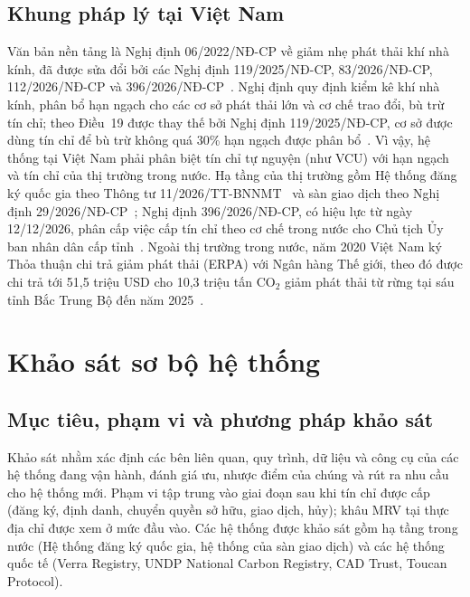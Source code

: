 \subsection*{Khung pháp lý tại Việt Nam}

Văn bản nền tảng là Nghị định 06/2022/NĐ-CP về giảm nhẹ phát thải khí nhà kính, đã được sửa đổi bởi các Nghị định 119/2025/NĐ-CP, 83/2026/NĐ-CP, 112/2026/NĐ-CP và 396/2026/NĐ-CP~\cite{vietnam2022nghidinh06}. Nghị định quy định kiểm kê khí nhà kính, phân bổ hạn ngạch cho các cơ sở phát thải lớn và cơ chế trao đổi, bù trừ tín chỉ; theo Điều~19 được thay thế bởi Nghị định 119/2025/NĐ-CP, cơ sở được dùng tín chỉ để bù trừ không quá 30\% hạn ngạch được phân bổ~\cite{vietnam2025nghidinh119}. Vì vậy, hệ thống tại Việt Nam phải phân biệt tín chỉ tự nguyện (như VCU) với hạn ngạch và tín chỉ của thị trường trong nước. Hạ tầng của thị trường gồm Hệ thống đăng ký quốc gia theo Thông tư 11/2026/TT-BNNMT~\cite{vietnam2026thongtu11} và sàn giao dịch theo Nghị định 29/2026/NĐ-CP~\cite{vietnam2026nghidinh29}; Nghị định 396/2026/NĐ-CP, có hiệu lực từ ngày 12/12/2026, phân cấp việc cấp tín chỉ theo cơ chế trong nước cho Chủ tịch Ủy ban nhân dân cấp tỉnh~\cite{vietnam2026nghidinh396}. Ngoài thị trường trong nước, năm 2020 Việt Nam ký Thỏa thuận chi trả giảm phát thải (ERPA) với Ngân hàng Thế giới, theo đó được chi trả tới 51,5 triệu USD cho 10,3 triệu tấn CO$_2$ giảm phát thải từ rừng tại sáu tỉnh Bắc Trung Bộ đến năm 2025~\cite{worldbank2020erpa}.

\section{Khảo sát sơ bộ hệ thống}
\label{sec:khaosatsobo}

\FloatBarrier
\subsection*{Mục tiêu, phạm vi và phương pháp khảo sát}
\label{subsec:ks-gioithieu}

Khảo sát nhằm xác định các bên liên quan, quy trình, dữ liệu và công cụ của các hệ thống đang vận hành, đánh giá ưu, nhược điểm của chúng và rút ra nhu cầu cho hệ thống mới. Phạm vi tập trung vào giai đoạn sau khi tín chỉ được cấp (đăng ký, định danh, chuyển quyền sở hữu, giao dịch, hủy); khâu MRV tại thực địa chỉ được xem ở mức đầu vào. Các hệ thống được khảo sát gồm hạ tầng trong nước (Hệ thống đăng ký quốc gia, hệ thống của sàn giao dịch) và các hệ thống quốc tế (Verra Registry, UNDP National Carbon Registry, CAD Trust, Toucan Protocol).

